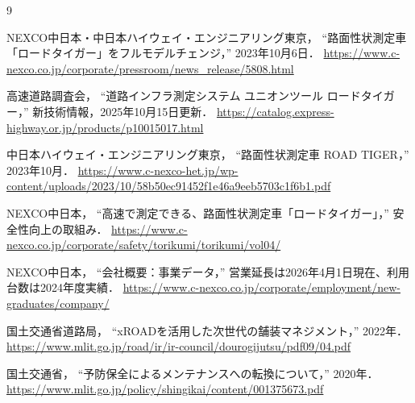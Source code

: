\documentclass[8pt,a4paper,twocolumn]{ltjsarticle}
\begin{document}
{\fontsize{6}{6.5}\selectfont

\setlength{\itemsep}{0pt}
\setlength{\parskip}{0pt}

\begin{thebibliography}{9}

NEXCO中日本・中日本ハイウェイ・エンジニアリング東京，
``路面性状測定車「ロードタイガー」をフルモデルチェンジ，''
2023年10月6日．
\url{https://www.c-nexco.co.jp/corporate/pressroom/news_release/5808.html}

高速道路調査会，
``道路インフラ測定システム ユニオンツール ロードタイガー，''
新技術情報，2025年10月15日更新．
\url{https://catalog.express-highway.or.jp/products/p10015017.html}

中日本ハイウェイ・エンジニアリング東京，
``路面性状測定車 ROAD TIGER，''
2023年10月．
\url{https://www.c-nexco-het.jp/wp-content/uploads/2023/10/58b50ec91452f1e46a9eeb5703c1f6b1.pdf}

NEXCO中日本，
``高速で測定できる、路面性状測定車「ロードタイガー」，''
安全性向上の取組み．
\url{https://www.c-nexco.co.jp/corporate/safety/torikumi/torikumi/vol04/}

NEXCO中日本，
``会社概要：事業データ，''
営業延長は2026年4月1日現在、利用台数は2024年度実績．
\url{https://www.c-nexco.co.jp/corporate/employment/new-graduates/company/}

国土交通省道路局，
``xROADを活用した次世代の舗装マネジメント，''
2022年．
\url{https://www.mlit.go.jp/road/ir/ir-council/dourogijutsu/pdf09/04.pdf}

国土交通省，
``予防保全によるメンテナンスへの転換について，''
2020年．
\url{https://www.mlit.go.jp/policy/shingikai/content/001375673.pdf}

\end{thebibliography}
}
\end{document}
